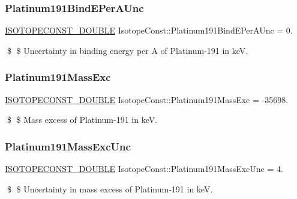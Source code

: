 \subsubsection{\texorpdfstring{Platinum191\+Bind\+E\+Per\+A\+Unc}{Platinum191BindEPerAUnc}}
{\footnotesize\ttfamily \mbox{\hyperlink{group___isotope_const-_macros_ga8f45a7272ce02c0b4c65c44636ed719a}{I\+S\+O\+T\+O\+P\+E\+C\+O\+N\+S\+T\+\_\+\+D\+O\+U\+B\+LE}} Isotope\+Const\+::\+Platinum191\+Bind\+E\+Per\+A\+Unc = 0.}

\$ \$ Uncertainty in binding energy per A of Platinum-\/191 in keV. \mbox{\label{group___isotope_const-_platinum-_pt191_ga0399d58103142c8cd962bb206ce71336}} 
\subsubsection{\texorpdfstring{Platinum191\+Mass\+Exc}{Platinum191MassExc}}
{\footnotesize\ttfamily \mbox{\hyperlink{group___isotope_const-_macros_ga8f45a7272ce02c0b4c65c44636ed719a}{I\+S\+O\+T\+O\+P\+E\+C\+O\+N\+S\+T\+\_\+\+D\+O\+U\+B\+LE}} Isotope\+Const\+::\+Platinum191\+Mass\+Exc = -\/35698.}

\$ \$ Mass excess of Platinum-\/191 in keV. \mbox{\label{group___isotope_const-_platinum-_pt191_ga3806252c624d9e8741cf7370c89920a9}} 
\subsubsection{\texorpdfstring{Platinum191\+Mass\+Exc\+Unc}{Platinum191MassExcUnc}}
{\footnotesize\ttfamily \mbox{\hyperlink{group___isotope_const-_macros_ga8f45a7272ce02c0b4c65c44636ed719a}{I\+S\+O\+T\+O\+P\+E\+C\+O\+N\+S\+T\+\_\+\+D\+O\+U\+B\+LE}} Isotope\+Const\+::\+Platinum191\+Mass\+Exc\+Unc = 4.}

\$ \$ Uncertainty in mass excess of Platinum-\/191 in keV. \mbox{\label{group___isotope_const-_platinum-_pt191_ga6c13a2bd210cba6211e6b1b3c3b8d407}} 
